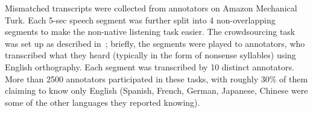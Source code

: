 \label{sec:methodsmc}

Mismatched transcripts were collected from annotators
on Amazon Mechanical Turk.
Each 5-sec speech segment was further split into 4
non-overlapping segments to make the non-native listening task
easier. The crowdsourcing task was set up as described
in~\cite{JHJ15b}; briefly, the segments were played to annotators,
who transcribed what they heard (typically in the form of nonsense
syllables) using English orthography. Each segment was
transcribed by 10 distinct annotators. More than 2500 annotators
participated in these tasks, with roughly 30\% of them claiming to
know only English (Spanish, French, German, Japanese, Chinese were
some of the other languages they reported knowing).

